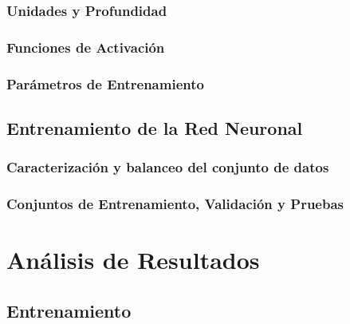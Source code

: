\documentclass[]{beamer}
\begin{document}
            \subsubsection*{Unidades y Profundidad}
            \begin{frame}
            \end{frame}

            \subsubsection*{Funciones de Activación}
            \begin{frame}
            \end{frame}

            \subsubsection*{Parámetros de Entrenamiento}
            \begin{frame}
            \end{frame}
        
        \subsection{Entrenamiento de la Red Neuronal}
            \subsubsection*{Caracterización y balanceo del conjunto de datos}
            \begin{frame}
            \end{frame}

            \subsubsection*{Conjuntos de Entrenamiento, Validación y Pruebas}
            \begin{frame}
            \end{frame}

    \section{Análisis de Resultados}
        \subsection{Entrenamiento}
\end{document}
